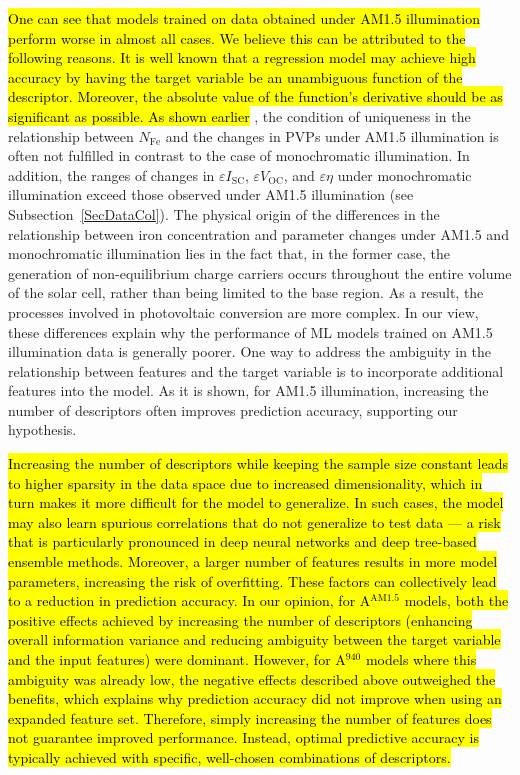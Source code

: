 \documentclass[a4paper,fleqn,draft]{cas-sc}
\begin{document}
\textcolor[rgb]{1.00,0.07,0.00}{
\hl{
One can see that models trained on data obtained under AM1.5 illumination perform worse in almost all cases.
We believe this can be attributed to the following reasons.
It is well known that a regression model may  achieve high accuracy
by having the target variable be an unambiguous function of the descriptor.
Moreover, the absolute value of the function’s derivative should be as significant as possible.
As shown earlier}  \cite{Olikh2025MSEB}, the condition of uniqueness in the relationship between $N_\mathrm{Fe}$ and
the changes in PVPs under AM1.5 illumination is often not fulfilled in contrast to the case of monochromatic illumination.
In addition, the ranges of changes in $\varepsilon I_\mathrm{SC}$, $\varepsilon V_\mathrm{OC}$, and $\varepsilon \eta$
under monochromatic illumination exceed those observed under AM1.5 illumination (see Subsection~\ref{SecDataCol}).
The physical origin of the differences in the relationship between iron concentration and
parameter changes under AM1.5 and monochromatic illumination lies in the fact that,
in the former case, the generation of non-equilibrium charge carriers occurs throughout the
entire volume of the solar cell, rather than being limited to the base region.
As a result, the processes involved in photovoltaic conversion are more complex.
In our view, these differences explain why the performance of ML models trained on AM1.5 illumination data is generally poorer.
One way to address the ambiguity in the relationship between features and the target variable
is to incorporate additional features into the model.
As it is shown, for AM1.5 illumination, increasing the number of descriptors often improves prediction accuracy, supporting our hypothesis.
}

\textcolor[rgb]{1.00,0.07,0.00}{
\hl{
Increasing the number of descriptors while keeping the sample size constant leads
to higher sparsity in the data space due to increased dimensionality,
which in turn makes it more difficult for the model to generalize.
In such cases, the model may also learn spurious correlations that do not generalize to test data ---
a risk that is particularly pronounced in deep neural networks and  deep tree-based ensemble methods.
Moreover, a larger number of features results in more model parameters, increasing the risk of overfitting.
These factors can collectively lead to a reduction in prediction accuracy.
In our opinion, for A$^\mathrm{AM1.5}$ models, both the positive effects achieved by increasing the number of descriptors
(enhancing overall information variance and reducing ambiguity between the target variable and the input features) were dominant.
However, for A$^\mathrm{940}$ models where this ambiguity was already low,
the negative effects described above outweighed the benefits,
which explains why prediction accuracy did not improve when using an expanded feature set.
Therefore, simply increasing the number of features does not guarantee improved performance.
Instead, optimal predictive accuracy is typically achieved with specific, well-chosen combinations of descriptors.
}}
\end{document}
